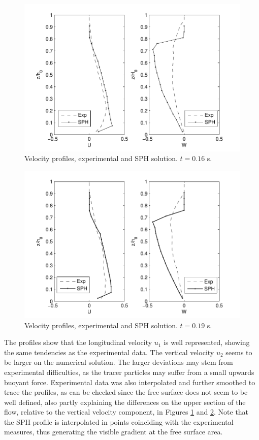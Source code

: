 %
\begin{figure}[H]
	\centering
	\includegraphics[width=0.65\linewidth]{Figures/5.Chapter/Profiles_interps_8_17}
	\caption{Velocity profiles, experimental and \ac{SPH} solution. $t=0.16$ s.}
	\label{fig:Profiles_interps_8_17} 
\end{figure}
%

%
\begin{figure}[H]
	\centering
	\includegraphics[width=0.65\linewidth]{Figures/5.Chapter/Profiles_interps_8_20}
	\caption{Velocity profiles, experimental and \ac{SPH} solution. $t=0.19$ s.}
	\label{fig:Profiles_interps_8_20} 
\end{figure}
%

The profiles show that the longitudinal velocity $u_1$ is well represented, showing the same tendencies as the experimental data. The vertical velocity $u_2$ seems to be larger on the numerical solution. The larger deviations may stem from experimental difficulties, as the tracer particles may suffer from a small upwards buoyant force. Experimental data was also interpolated and further smoothed to trace the profiles, as can be checked since the free surface does not seem to be well defined, also partly explaining the differences on the upper section of the flow, relative to the vertical velocity component, in Figures \ref{fig:Profiles_interps_8_17} and \ref{fig:Profiles_interps_8_20}. Note that the SPH profile is interpolated in points coinciding with the experimental measures, thus generating the visible gradient at the free surface area.

\clearpage
